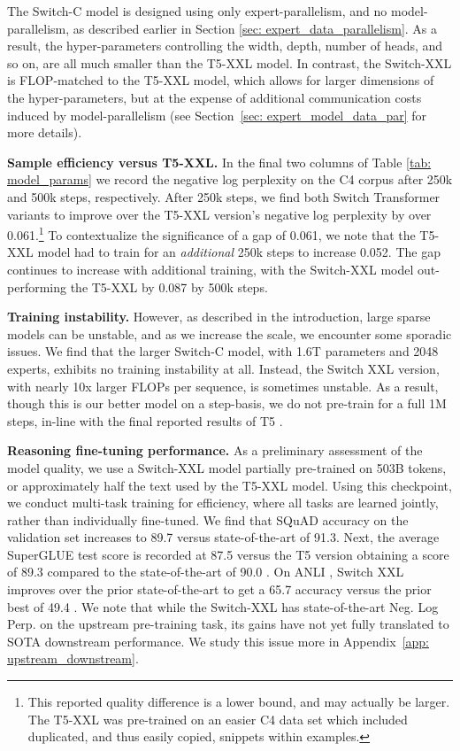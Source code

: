 \documentclass[twoside,11pt]{article}
\begin{document}
The Switch-C model is designed using only expert-parallelism, and no model-parallelism, as described earlier in Section \ref{sec: expert_data_parallelism}.
As a result, the hyper-parameters controlling the width, depth, number of heads, and so on, are all much smaller than the T5-XXL model.
In contrast, the Switch-XXL is FLOP-matched to the T5-XXL model, which allows for larger dimensions of the hyper-parameters, but at the expense of additional communication costs induced by model-parallelism (see Section~\ref{sec: expert_model_data_par} for more details).

\textbf{Sample efficiency versus T5-XXL.} In the final two columns of Table \ref{tab: model_params} we record the negative log perplexity on the C4 corpus after 250k and 500k steps, respectively.
After 250k steps, we find both Switch Transformer variants to improve over the T5-XXL version's negative log perplexity by over 0.061.\footnote{This reported quality difference is a lower bound, and may actually be larger. The T5-XXL was pre-trained on an easier C4 data set which included duplicated, and thus easily copied, snippets within examples.}
To contextualize the significance of a gap of 0.061, we note that the T5-XXL model had to train for an \emph{additional} 250k steps to increase 0.052.
The gap continues to increase with additional training, with the Switch-XXL model out-performing the T5-XXL by 0.087 by 500k steps.

\textbf{Training instability.} However, as described in the introduction, large sparse models can be unstable, and as we increase the scale, we encounter some sporadic issues.
We find that the larger Switch-C model, with 1.6T parameters and 2048 experts, exhibits no training instability at all.
Instead, the Switch XXL version, with nearly 10x larger FLOPs per sequence, is sometimes unstable.
As a result, though this is our better model on a step-basis, we do not pre-train for a full 1M steps, in-line with the final reported results of T5 \citep{raffel2019exploring}.

\textbf{Reasoning fine-tuning performance.} As a preliminary assessment of the model quality, we use a Switch-XXL model partially pre-trained on 503B tokens, or approximately half the text used by the T5-XXL model.
Using this checkpoint, we conduct multi-task training for efficiency, where all tasks are learned jointly, rather than individually fine-tuned.
We find that SQuAD accuracy on the validation set increases to 89.7 versus state-of-the-art of 91.3.
Next, the average SuperGLUE test score is recorded at 87.5 versus the T5 version obtaining a score of 89.3 compared to the state-of-the-art of 90.0 \citep{wang2019superglue}.
On ANLI \citep{nie2019adversarial}, Switch XXL improves over the prior state-of-the-art to get a 65.7 accuracy versus the prior best of 49.4 \citep{yang2020xlnet}. 
We note that while the Switch-XXL has state-of-the-art Neg. Log Perp. on the upstream pre-training task, its gains have not yet fully translated to SOTA downstream performance.
We study this issue more in Appendix~\ref{app: upstream_downstream}.
\end{document}
